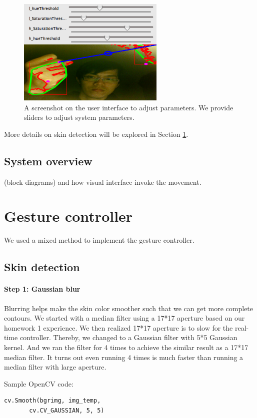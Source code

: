 \documentclass[10pt,twocolumn,letterpaper]{article}
\begin{document}
\begin{figure}[h]
\centering
\includegraphics[width=7cm]{adjustui.png}
\caption{A screenshot on the user interface to adjust parameters. We provide 
sliders to adjust system parameters.}
\label{fig:adjusting}
\end{figure}

More details on skin detection will be explored in Section \ref{sec:gesture}.

\subsection{System overview}
(block diagrams) and how visual interface invoke the movement.

\section{Gesture controller}
\label{sec:gesture}
We used a mixed method to implement the gesture controller.

\subsection{Skin detection}
\label{sec:skin}
\paragraph{Step 1: Gaussian blur}
Blurring helps make the skin color smoother such that we can get more complete contours. 
We started with a median filter using a 17*17 aperture based on our homework 1 experience. 
We then realized 17*17 aperture is to slow for the real-time controller. Thereby, we 
changed to a Gaussian filter with 5*5 Gaussian kernel. And we ran the filter for 4 times 
to achieve the similar result as a 17*17 median filter. It turns out even running 4 times 
is much faster than running a median filter with large aperture.

Sample OpenCV code:
\begin{verbatim}
cv.Smooth(bgrimg, img_temp, 
       cv.CV_GAUSSIAN, 5, 5)
\end{verbatim}
\end{document}
